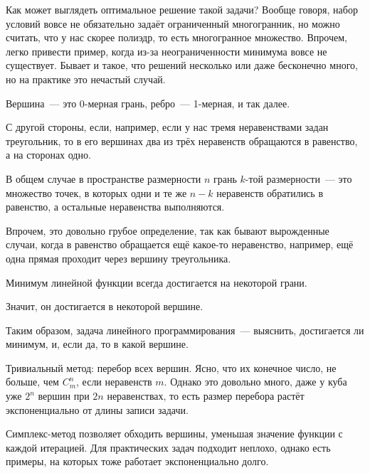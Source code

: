 Как может выглядеть оптимальное решение такой задачи?
Вообще говоря, набор условий вовсе не обязательно задаёт ограниченный многогранник, но можно считать, что у нас скорее полиэдр, то есть многогранное множество.
Впрочем, легко привести пример, когда из-за неограниченности минимума вовсе не существует.
Бывает и такое, что решений несколько или даже бесконечно много, но на практике это нечастый случай.

\begin{remark*}
  Вершина~--- это 0-мерная грань, ребро~--- 1-мерная, и так далее.

  С другой стороны, если, например, если у нас тремя неравенствами задан треугольник, то в его вершинах два из трёх неравенств обращаются в равенство, а на сторонах одно.

  В общем случае в пространстве размерности $n$ грань $k$-той размерности~--- это множество точек, в которых одни и те же $n-k$ неравенств обратились в равенство, 
  а остальные неравенства выполняются.
\end{remark*}

\begin{remark*}
  Впрочем, это довольно грубое определение, так как бывают вырожденные случаи, когда в равенство обращается ещё какое-то неравенство, например, 
  ещё одна прямая проходит через вершину треугольника.
\end{remark*}

\begin{claim}
  Минимум линейной функции всегда достигается на некоторой грани.
\end{claim}
\begin{remark*}
  Значит, он достигается в некоторой вершине.
\end{remark*}

Таким образом, задача линейного программирования~--- выяснить, достигается ли минимум, и, если да, то в какой вершине.

Тривиальный метод: перебор всех вершин.
Ясно, что их конечное число, не больше, чем $C_{m}^{n}$, если неравенств $m$. 
Однако это довольно много, даже у куба уже $2^n$ вершин при $2n$ неравенствах, то есть размер перебора растёт экспоненциально от длины записи задачи.

Симплекс-метод позволяет обходить вершины, уменьшая значение функции с каждой итерацией.
Для практических задач подходит неплохо, однако есть примеры, на которых тоже работает экспоненциально долго.



